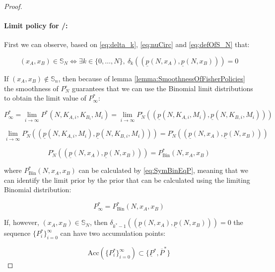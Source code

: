 \documentclass{article}
\theoremstyle{definition}
\begin{document}
\begin{proof}
\paragraph{Limit policy for \PII/:}

First we can observe, based on \eqref{eq:delta_k}, \eqref{eq:nuCirc} and \eqref{eq:defOfS_N} that:

\begin{equation}
    (x_A,x_B) \in \mathbb{S}_N \iff
    \exists k\in\{0,\dots,N\}, \ \delta_k((\underline{p}(N,x_A),\underline{p}(N,x_B))) = 0
\end{equation}

If $(x_A,x_B) \notin \mathbb{S}_n$, then because of lemma \ref{lemma:SmoothnessOfFisherPolicies} the smoothness of $P^\circ_N$ guarantees that we can use the Binomial limit distributions to obtain the limit value of $P^*_\infty$:

\begin{equation}
    P^*_\infty = \lim_{i\to\infty} P^*(N,K_{A,i},K_{B_i},M_i) = 
    \lim_{i\to\infty} P^\circ_N((\underline{p}(N,K_{A,i},M_i),\underline{p}(N,K_{B,i},M_i)))
\end{equation}

\begin{equation}
    \lim_{i\to\infty} P^\circ_N((\underline{p}(N,K_{A,i},M_i),\underline{p}(N,K_{B,i},M_i))) = P^\circ_N((\underline{p}(N,x_A),\underline{p}(N,x_B)))
\end{equation}

\begin{equation}
    P^\circ_N((\underline{p}(N,x_A),\underline{p}(N,x_B))) = P^*_\text{Bin}(N,x_A,x_B)
\end{equation}

where $P^*_\text{Bin}(N,x_A,x_B)$ can be calculated by \eqref{eq:SymBinEqP}, meaning that we can identify the limit prior by the prior that can be calculated using the limiting Binomial distribution:

\begin{equation}
    P^*_\infty = P^*_\text{Bin}(N,x_A,x_B)
\end{equation}

If, however, $(x_A,x_B) \in \mathbb{S}_N$, then $\delta_{k^*-1}((\underline{p}(N,x_A),\underline{p}(N,x_B)))=0$ the sequence $\{P^*_i\}_{i=0}^\infty$ can have two accumulation points:

\begin{equation}
    \mathrm{Acc} \left ( \{P^*_i\}_{i=0}^\infty \right) \subset \{\underline{P}^*, \overline{P}^*\}
\end{equation}


\end{proof}
\end{document}
